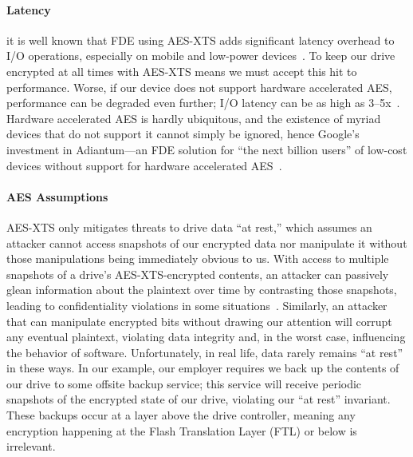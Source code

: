 \paragraph*{Latency} it is well known that FDE using AES-XTS adds
significant latency overhead to I/O operations, especially on mobile
and low-power devices~\cite{google-engadget,
  android-M-mobile-motivation, android-M-mobile-motivation-2}. To keep
our drive encrypted at all times with AES-XTS means we must accept
this hit to performance. Worse, if our device does not support
hardware accelerated AES, performance can be degraded even further;
I/O latency can be as high as 3--5x~\cite{StrongBox}.  Hardware
accelerated AES is hardly ubiquitous, and the existence of myriad
devices that do not support it cannot simply be ignored, hence
Google's investment in Adiantum---an FDE solution for ``the next
billion users'' of low-cost devices without support for hardware
accelerated AES~\cite{Adiantum}.

\paragraph*{AES Assumptions} AES-XTS only mitigates threats to drive
data ``at rest,'' which assumes an attacker cannot access snapshots of
our encrypted data nor manipulate it without those manipulations being
immediately obvious to us. With access to multiple snapshots of a
drive's AES-XTS-encrypted contents, an attacker can passively glean
information about the plaintext over time by contrasting those
snapshots, leading to confidentiality violations in some
situations~\cite{XEX, XTS}.  Similarly, an attacker that can
manipulate encrypted bits without drawing our attention will corrupt
any eventual plaintext, violating data integrity and, in the worst
case, influencing the behavior of software.   Unfortunately, in real life, data
rarely remains ``at rest'' in these ways. In our example, our employer
requires we back up the contents of our drive to some offsite backup
service; this service will receive periodic snapshots of the encrypted
state of our drive, violating our ``at rest'' invariant. These backups
occur at a layer above the drive controller, meaning any encryption
happening at the Flash Translation Layer (FTL) or below is irrelevant.

